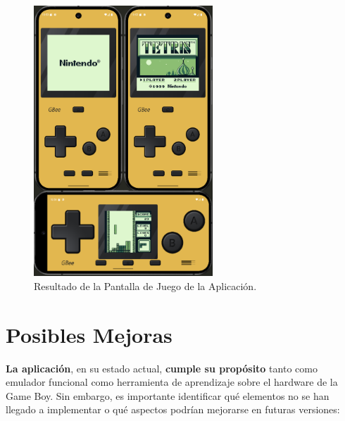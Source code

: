 \begin{figure}[H]
    \centering
    \includegraphics[width=0.6\textwidth]{include/images/results_emu.png}
    \caption{Resultado de la Pantalla de Juego de la Aplicación.}\label{figure:resultemu}
\end{figure}

\section{Posibles Mejoras}

\textbf{La aplicación}, en su estado actual, \textbf{cumple su propósito} tanto como emulador funcional como herramienta de aprendizaje sobre el hardware de la Game Boy. Sin embargo, es importante identificar qué elementos no se han llegado a implementar o qué aspectos podrían mejorarse en futuras versiones:

